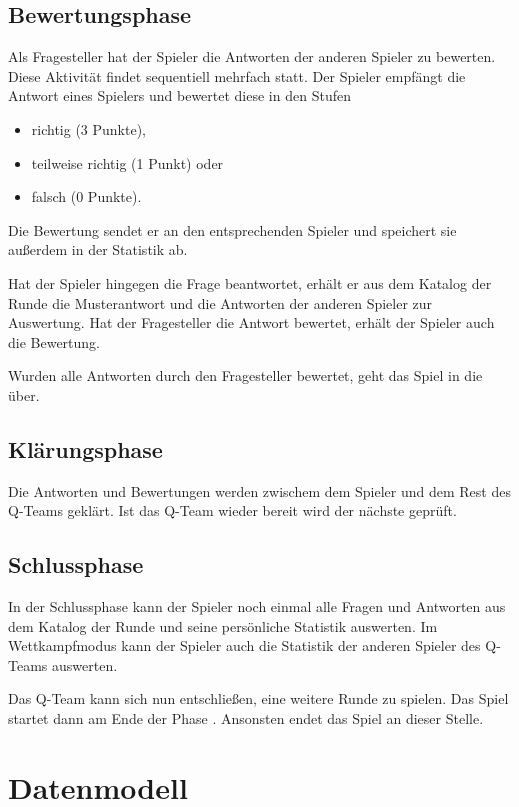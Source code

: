 \documentclass[a4paper,11pt,listof=numbered,glossary=totoc,parskip=half,toc=bib]{scrreprt}
\begin{document}
	\subsection{Bewertungsphase}
	\label{subsec:bewertungsphase}
	Als Fragesteller hat der Spieler die Antworten der anderen Spieler zu bewerten. Diese Aktivität findet sequentiell mehrfach statt. Der Spieler empfängt die Antwort eines Spielers und bewertet diese in den Stufen
	\begin{itemize}
	\item richtig (3 Punkte),
	\item teilweise richtig (1 Punkt) oder
	\item falsch (0 Punkte).
	\end{itemize}
	Die Bewertung sendet er an den entsprechenden Spieler und speichert sie außerdem in der Statistik ab.
	
	Hat der Spieler hingegen die Frage beantwortet, erhält er aus dem Katalog der Runde die Musterantwort und die Antworten der anderen Spieler zur Auswertung. Hat der Fragesteller die Antwort bewertet, erhält der Spieler auch die Bewertung.
	
	Wurden alle Antworten durch den Fragesteller bewertet, geht das Spiel in die  über.
	
	\subsection{Klärungsphase}
	\label{subsec:klaerungsphase}
	Die Antworten und Bewertungen werden zwischem dem Spieler und dem Rest des Q-Teams geklärt. Ist das Q-Team wieder bereit wird der nächste  geprüft.
	
	\subsection{Schlussphase}
	\label{subsec:schlussphase}
	In der Schlussphase kann der Spieler noch einmal alle Fragen und Antworten aus dem Katalog der Runde  und seine persönliche Statistik auswerten. Im Wettkampfmodus kann der Spieler auch die Statistik der anderen Spieler des Q-Teams auswerten.
	
	Das Q-Team kann sich nun entschließen, eine weitere Runde zu spielen. Das Spiel startet dann am Ende der Phase . Ansonsten endet das Spiel an dieser Stelle.
	 
	
	\section{Datenmodell}
	
\end{document}
